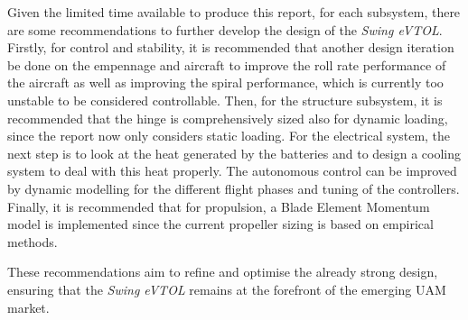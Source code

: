 Given the limited time available to produce this report, for each subsystem,
there are some recommendations to further develop the design of the \textit{Swing eVTOL}.
Firstly, for control and stability,
it is recommended
that another design iteration be done on the empennage and aircraft to improve the roll rate performance of the aircraft
as well as improving the spiral performance,
which is currently too unstable to be considered controllable.
Then, for the structure subsystem, it is recommended that the hinge is comprehensively sized also for dynamic loading,
since the report now only considers static loading.
For the electrical system, the next step is to look at the heat generated by the batteries
and to design a cooling system to deal with this heat properly.
The autonomous control can be improved by dynamic modelling for the different flight phases and tuning of the controllers.
Finally, it is recommended that for propulsion,
a Blade Element Momentum model is implemented since the current propeller sizing is based on empirical methods.

These recommendations aim to refine and optimise the already strong design,
ensuring that the \textit{Swing eVTOL} remains at the forefront of the emerging UAM market.